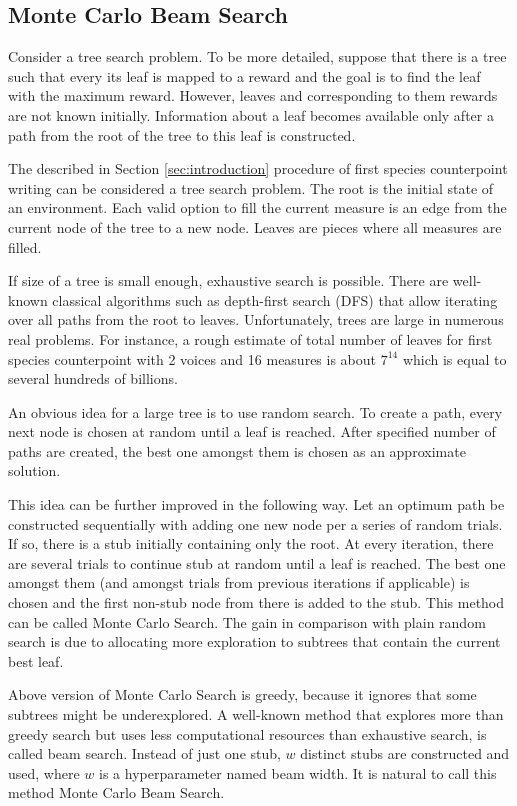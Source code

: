 \documentclass{article}
\begin{document}
\subsection{Monte Carlo Beam Search}
\label{subsec:montecarlo}

Consider a tree search problem. To be more detailed, suppose that there is a tree such that every its leaf is mapped to a reward and the goal is to find the leaf with the maximum reward. However, leaves and corresponding to them rewards are not known initially. Information about a leaf becomes available only after a path from the root of the tree to this leaf is constructed.

The described in Section \ref{sec:introduction} procedure of first species counterpoint writing can be considered a tree search problem. The root is the initial state of an environment. Each valid option to fill the current measure is an edge from the current node of the tree to a new node. Leaves are pieces where all measures are filled. 

If size of a tree is small enough, exhaustive search is possible. There are well-known classical algorithms such as depth-first search (DFS) that allow iterating over all paths from the root to leaves. Unfortunately, trees are large in numerous real problems. For instance, a rough estimate of total number of leaves for first species counterpoint with 2 voices and 16 measures is about $7^{14}$ which is equal to several hundreds of billions.

An obvious idea for a large tree is to use random search. To create a path, every next node is chosen at random until a leaf is reached. After specified number of paths are created, the best one amongst them is chosen as an approximate solution.

This idea can be further improved in the following way. Let an optimum path be constructed sequentially with adding one new node per a series of random trials. If so, there is a stub initially containing only the root. At every iteration, there are several trials to continue stub at random until a leaf is reached. The best one amongst them (and amongst trials from previous iterations if applicable) is chosen and the first non-stub node from there is added to the stub. This method can be called Monte Carlo Search. The gain in comparison with plain random search is due to allocating more exploration to subtrees that contain the current best leaf.

Above version of Monte Carlo Search is greedy, because it ignores that some subtrees might be underexplored. A well-known method that explores more than greedy search but uses less computational resources than exhaustive search, is called beam search. Instead of just one stub, $w$ distinct stubs are constructed and used, where $w$ is a hyperparameter named beam width. It is natural to call this method Monte Carlo Beam Search.
\end{document}
